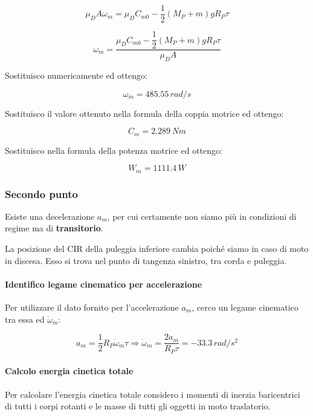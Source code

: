 \documentclass[main.tex]{subfiles}
\begin{document}
\[
	\mu_DA\omega_m = \mu_DC_{m0} - \dfrac{1}{2}(M_P + m)gR_P\tau
\]

\[
	\omega_m = \dfrac{\mu_DC_{m0} - \dfrac{1}{2}(M_P + m)gR_P\tau}{\mu_DA}
\]

Sostituisco numericamente ed ottengo:

\[
	\omega_m = 485.55\,rad/s
\]

Sostituisco il valore ottenuto nella formula della coppia motrice ed ottengo:

\[
	C_m = 2.289\,Nm
\]

Sostituisco nella formula della potenza motrice ed ottengo:

\[
	W_m = 1111.4\,W
\]

\subsubsection{Secondo punto}
Esiste una decelerazione $a_m$, per cui certamente non siamo più in condizioni di regime ma di \textbf{transitorio}.

La posizione del CIR della puleggia inferiore cambia poiché siamo in caso di moto in discesa. Esso si trova nel punto di tangenza sinistro, tra corda e puleggia.

\paragraph{Identifico legame cinematico per accelerazione} Per utilizzare il dato fornito per l'accelerazione $a_m$, cerco un legame cinematico tra essa ed $\dot{\omega}_m$:

\begin{center}
\end{center}

\[
	a_m = \dfrac{1}{2}R_P\dot{\omega}_m\tau \Longrightarrow \dot{\omega}_m = \dfrac{2a_m}{R_P\tau} = -33.3\,rad/s^2
\]

\paragraph{Calcolo energia cinetica totale} Per calcolare l'energia cinetica totale considero i momenti di inerzia baricentrici di tutti i corpi rotanti e le masse di tutti gli oggetti in moto traslatorio.
\end{document}
